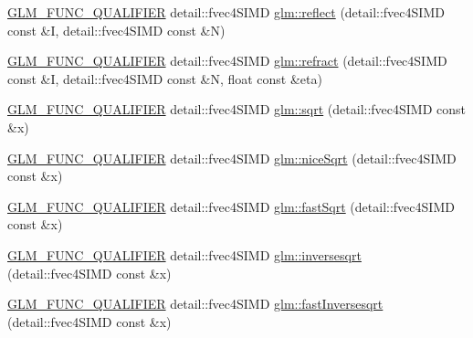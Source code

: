 \begin{DoxyCompactItemize}
\item 
\hyperlink{setup_8hpp_a33fdea6f91c5f834105f7415e2a64407}{G\+L\+M\+\_\+\+F\+U\+N\+C\+\_\+\+Q\+U\+A\+L\+I\+F\+I\+ER} detail\+::fvec4\+S\+I\+MD \hyperlink{namespaceglm_aca05cfddf931415f023b4ac91b96d739}{glm\+::reflect} (detail\+::fvec4\+S\+I\+MD const \&I, detail\+::fvec4\+S\+I\+MD const \&N)
\item 
\hyperlink{setup_8hpp_a33fdea6f91c5f834105f7415e2a64407}{G\+L\+M\+\_\+\+F\+U\+N\+C\+\_\+\+Q\+U\+A\+L\+I\+F\+I\+ER} detail\+::fvec4\+S\+I\+MD \hyperlink{namespaceglm_a6b7db0c107279793b77576c2eef680b3}{glm\+::refract} (detail\+::fvec4\+S\+I\+MD const \&I, detail\+::fvec4\+S\+I\+MD const \&N, float const \&eta)
\item 
\hyperlink{setup_8hpp_a33fdea6f91c5f834105f7415e2a64407}{G\+L\+M\+\_\+\+F\+U\+N\+C\+\_\+\+Q\+U\+A\+L\+I\+F\+I\+ER} detail\+::fvec4\+S\+I\+MD \hyperlink{namespaceglm_a0af4fc25d7a64d4947598f48a0229375}{glm\+::sqrt} (detail\+::fvec4\+S\+I\+MD const \&x)
\item 
\hyperlink{setup_8hpp_a33fdea6f91c5f834105f7415e2a64407}{G\+L\+M\+\_\+\+F\+U\+N\+C\+\_\+\+Q\+U\+A\+L\+I\+F\+I\+ER} detail\+::fvec4\+S\+I\+MD \hyperlink{namespaceglm_a4b8b68e979fc5b12aba9290beb8dfb30}{glm\+::nice\+Sqrt} (detail\+::fvec4\+S\+I\+MD const \&x)
\item 
\hyperlink{setup_8hpp_a33fdea6f91c5f834105f7415e2a64407}{G\+L\+M\+\_\+\+F\+U\+N\+C\+\_\+\+Q\+U\+A\+L\+I\+F\+I\+ER} detail\+::fvec4\+S\+I\+MD \hyperlink{namespaceglm_a668307d251c9bc5a349ab3d2d83095d4}{glm\+::fast\+Sqrt} (detail\+::fvec4\+S\+I\+MD const \&x)
\item 
\hyperlink{setup_8hpp_a33fdea6f91c5f834105f7415e2a64407}{G\+L\+M\+\_\+\+F\+U\+N\+C\+\_\+\+Q\+U\+A\+L\+I\+F\+I\+ER} detail\+::fvec4\+S\+I\+MD \hyperlink{namespaceglm_ac3ad88ad132bb5179b928f3f57afc6b5}{glm\+::inversesqrt} (detail\+::fvec4\+S\+I\+MD const \&x)
\item 
\hyperlink{setup_8hpp_a33fdea6f91c5f834105f7415e2a64407}{G\+L\+M\+\_\+\+F\+U\+N\+C\+\_\+\+Q\+U\+A\+L\+I\+F\+I\+ER} detail\+::fvec4\+S\+I\+MD \hyperlink{namespaceglm_af499190525c6e1f524054b9b18b12444}{glm\+::fast\+Inversesqrt} (detail\+::fvec4\+S\+I\+MD const \&x)
\end{DoxyCompactItemize}
